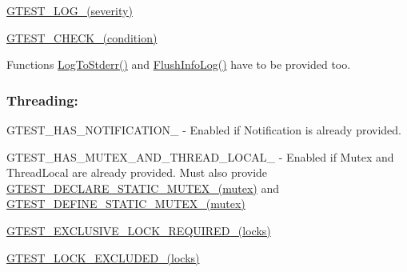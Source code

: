 \begin{DoxyItemize}
\item {\ttfamily \mbox{\hyperlink{_obj__test_2lib_2googletest-release-1_88_81_2googletest_2include_2gtest_2internal_2gtest-port_8h_a8ef4cb4c465db8c15464aecc6d9510ef}{G\+T\+E\+S\+T\+\_\+\+L\+O\+G\+\_\+(severity)}}}
\item {\ttfamily \mbox{\hyperlink{_obj__test_2lib_2googletest-release-1_88_81_2googletest_2include_2gtest_2internal_2gtest-port_8h_ab54343f0a36dc4cb0ce8a478dd7847b8}{G\+T\+E\+S\+T\+\_\+\+C\+H\+E\+C\+K\+\_\+(condition)}}}
\item Functions {\ttfamily \mbox{\hyperlink{namespacetesting_1_1internal_a06b1b20029fbd1dbeb59752f914fab84}{Log\+To\+Stderr()}}} and {\ttfamily \mbox{\hyperlink{namespacetesting_1_1internal_a2135f223bf6b527729aeaa651115183b}{Flush\+Info\+Log()}}} have to be provided too.
\end{DoxyItemize}

\subsubsection*{Threading\+:}


\begin{DoxyItemize}
\item {\ttfamily G\+T\+E\+S\+T\+\_\+\+H\+A\+S\+\_\+\+N\+O\+T\+I\+F\+I\+C\+A\+T\+I\+O\+N\+\_\+} -\/ Enabled if Notification is already provided.
\item {\ttfamily G\+T\+E\+S\+T\+\_\+\+H\+A\+S\+\_\+\+M\+U\+T\+E\+X\+\_\+\+A\+N\+D\+\_\+\+T\+H\+R\+E\+A\+D\+\_\+\+L\+O\+C\+A\+L\+\_\+} -\/ Enabled if {\ttfamily Mutex} and {\ttfamily Thread\+Local} are already provided. Must also provide {\ttfamily \mbox{\hyperlink{_obj__test_2lib_2googletest-release-1_88_81_2googletest_2include_2gtest_2internal_2gtest-port_8h_af0970cdea09f16dbb1dbfccdaa693eeb}{G\+T\+E\+S\+T\+\_\+\+D\+E\+C\+L\+A\+R\+E\+\_\+\+S\+T\+A\+T\+I\+C\+\_\+\+M\+U\+T\+E\+X\+\_\+(mutex)}}} and {\ttfamily \mbox{\hyperlink{_obj__test_2lib_2googletest-release-1_88_81_2googletest_2include_2gtest_2internal_2gtest-port_8h_a85d5cd679fdbe87383e7dfd1c6651eaa}{G\+T\+E\+S\+T\+\_\+\+D\+E\+F\+I\+N\+E\+\_\+\+S\+T\+A\+T\+I\+C\+\_\+\+M\+U\+T\+E\+X\+\_\+(mutex)}}}
\item {\ttfamily \mbox{\hyperlink{_obj__test_2lib_2googletest-release-1_88_81_2googletest_2include_2gtest_2internal_2gtest-port_8h_a149f693bd59fa1bc937af54c0cdcb32f}{G\+T\+E\+S\+T\+\_\+\+E\+X\+C\+L\+U\+S\+I\+V\+E\+\_\+\+L\+O\+C\+K\+\_\+\+R\+E\+Q\+U\+I\+R\+E\+D\+\_\+(locks)}}}
\item {\ttfamily \mbox{\hyperlink{_obj__test_2lib_2googletest-release-1_88_81_2googletest_2include_2gtest_2internal_2gtest-port_8h_a69abff5a4efdd07bd5faebe3dd318d06}{G\+T\+E\+S\+T\+\_\+\+L\+O\+C\+K\+\_\+\+E\+X\+C\+L\+U\+D\+E\+D\+\_\+(locks)}}}
\end{DoxyItemize}

